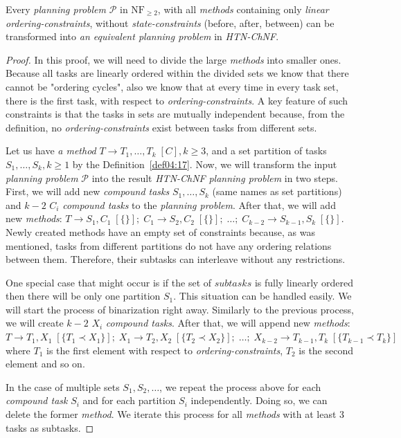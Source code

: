 \begin{thm}\label{thm04:6}
    Every \emph{planning problem} $\mathcal{P}$ in $\text{NF}_{\geq 2}$, with all \emph{methods} containing only \emph{linear ordering-constraints}, without \emph{state-constraints} (before, after, between) can be transformed into \emph{an equivalent planning problem} in \emph{HTN-ChNF}.
\end{thm}
\begin{proof}
     In this proof, we will need to divide the large \emph{methods} into smaller ones. Because all tasks are linearly ordered within the divided sets we know that there cannot be "ordering cycles", also we know that at every time in every task set, there is the first task, with respect to \emph{ordering-constraints}. A key feature of such constraints is that the tasks in sets are mutually independent because, from the definition, no \emph{ordering-constraints} exist between tasks from different sets. 

     Let us have \emph{a method} $T \rightarrow T_1, \dots, T_k \; [C], k \geq 3$, and a set partition of tasks $S_1, \dots, S_k, k \geq 1$ by the Definition~\ref{def04:17}. Now, we will transform the input \emph{planning problem} $\mathcal{P}$ into the result \emph{HTN-ChNF} \emph{planning problem} in two steps. First, we will add new \emph{compound tasks} $S_1, \dots, S_k$ (same names as set partitions) and $k - 2$ $C_i$ \emph{compound tasks} to the \emph{planning problem}. After that, we will add new \emph{methods}: $T \rightarrow S_1, C_1 \; [\{\}]; \; C_1 \rightarrow S_2, C_2 \; [\{\}]; \; \dots; \; C_{k - 2} \rightarrow S_{k - 1}, S_k \; [\{\}]$. Newly created methods have an empty set of constraints because, as was mentioned, tasks from different partitions do not have any ordering relations between them. Therefore, their subtasks can interleave without any restrictions. 
     
     One special case that might occur is if the set of $subtasks$ is fully linearly ordered then there will be only one partition $S_1$. This situation can be handled easily. We will start the process of binarization right away. Similarly to the previous process, we will create $k - 2$ $X_i$ \emph{compound tasks}. After that, we will append new \emph{methods}: $T \rightarrow T_1, X_1 \; [\{T_1 \prec X_1\}]; \; X_1 \rightarrow T_2, X_2 \; [\{T_2 \prec X_2\}]; \; \dots; \; X_{k - 2} \rightarrow T_{k - 1}, T_k \; [\{T_{k - 1} \prec T_k\}]$ where $T_1$ is the first element with respect to \emph{ordering-constraints}, $T_2$ is the second element and so on.

     In the case of multiple sets $S_1, S_2, \dots$, we repeat the process above for each \emph{compound task} $S_i$ and for each partition $S_i$ independently. Doing so, we can delete the former \emph{method}. We iterate this process for all \emph{methods} with at least 3 tasks as subtasks.
\end{proof}

